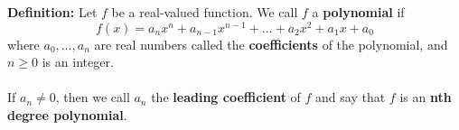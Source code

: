 \documentclass{article}
\begin{document}
	\textbf{Definition:} Let $f$ be a real-valued function. We call $f$ a \textbf{polynomial} if
	$$f(x) = a_nx^n + a_{n-1}x^{n-1} + \ldots + a_2x^2 + a_1x + a_0$$
	where $a_0, \ldots, a_n$ are real numbers called the \textbf{coefficients} of the polynomial,
	and $n \geq 0 $ is an integer. \\\\
	If $a_n \neq 0$, then we call $a_n$ the \textbf{leading coefficient} of $f$ and say that $f$ is an \textbf{nth degree polynomial}.
\end{document}
